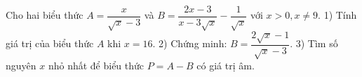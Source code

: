 
\begin{bt}


Cho hai biểu thức $A = \dfrac{x}{\sqrt{x}-3}$ và $B = \dfrac{2x-3}{x-3\sqrt{x}} - \dfrac{1}{\sqrt{x}}$ với $x > 0, x \neq 9$.
1) Tính giá trị của biểu thức $A$ khi $x = 16$.
2) Chứng minh: $B = \dfrac{2\sqrt{x}-1}{\sqrt{x}-3}$.
3) Tìm số nguyên $x$ nhỏ nhất để biểu thức $P = A - B$ có giá trị âm.
\loigiai{}
\end{bt}
